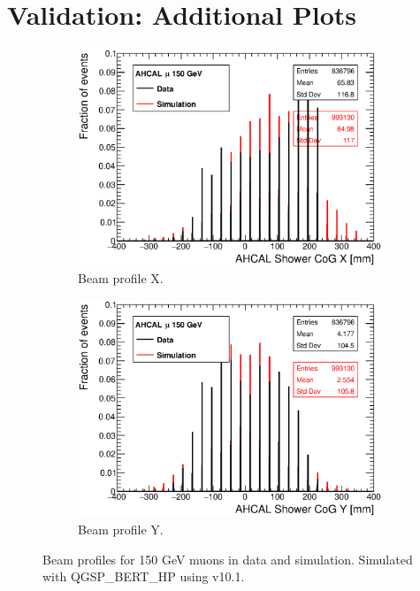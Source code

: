\chapter{Validation: Additional Plots}
\label{appendix:SimulationVal}

\begin{figure}[htbp!]
  \centering
  \begin{subfigure}[t]{0.49\textwidth}
    \includegraphics[width=1.\linewidth]{../Thesis_Plots/EnergyCalib/Plots/BeamProfileX.eps}
    \caption{Beam profile X.} \label{fig:mu150GeVX}
  \end{subfigure}
  \hfill
  \begin{subfigure}[t]{0.49\textwidth}
    \includegraphics[width=1.\linewidth]{../Thesis_Plots/EnergyCalib/Plots/BeamProfileY.eps}
    \caption{Beam profile Y.} \label{fig:mu150GeVY}
  \end{subfigure}
  \caption{Beam profiles for 150 GeV muons in data and simulation. Simulated with QGSP\_BERT\_HP using \geant v10.1.}
  \label{fig:BPmu}
\end{figure}

